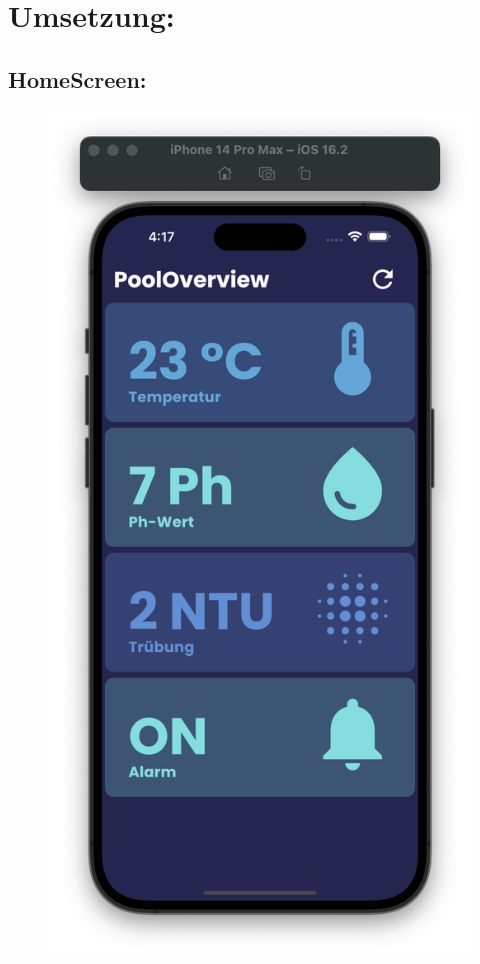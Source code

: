 \section{Umsetzung:}
\subsection*{HomeScreen:}
\begin{figure}[h!]
    \begin{minipage}[c]{0.5\textwidth}
      \includegraphics[width=\textwidth]{./pics/StartpageBild.png}

\end{minipage}
\end{figure}
